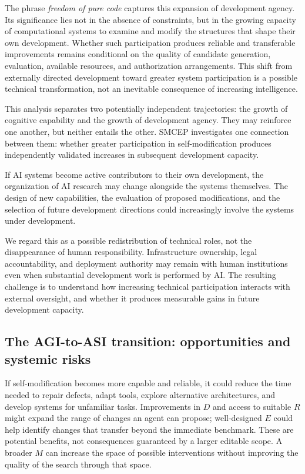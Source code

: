 \documentclass[11pt,a4paper]{article}
\begin{document}
The phrase \emph{freedom of pure code} captures this expansion of development agency. Its significance lies not in the absence of constraints, but in the growing capacity of computational systems to examine and modify the structures that shape their own development. Whether such participation produces reliable and transferable improvements remains conditional on the quality of candidate generation, evaluation, available resources, and authorization arrangements. This shift from externally directed development toward greater system participation is a possible technical transformation, not an inevitable consequence of increasing intelligence.

This analysis separates two potentially independent trajectories: the growth of cognitive capability and the growth of development agency. They may reinforce one another, but neither entails the other. SMCEP investigates one connection between them: whether greater participation in self-modification produces independently validated increases in subsequent development capacity.

If AI systems become active contributors to their own development, the organization of AI research
may change alongside the systems themselves. The design of new capabilities, the evaluation of proposed modifications, and the selection of future development directions could increasingly involve the systems under development.

We regard this as a possible redistribution of technical roles, not the disappearance of human
responsibility. Infrastructure ownership, legal accountability, and deployment authority may
remain with human institutions even when substantial development work is performed by AI.
The resulting challenge is to understand how increasing technical participation interacts with
external oversight, and whether it produces measurable gains in future development capacity.

\subsection{The AGI-to-ASI transition: opportunities and systemic risks}
If self-modification becomes more capable and reliable, it could reduce the time needed to repair defects, adapt tools, explore alternative architectures, and develop systems for unfamiliar tasks. Improvements in $D$ and access to suitable $R$ might expand the range of changes an agent can propose; well-designed $E$ could help identify changes that transfer beyond the immediate benchmark. These are potential benefits, not consequences guaranteed by a larger editable scope. A broader $M$ can increase the space of possible interventions without improving the quality of the search through that space.
\end{document}
